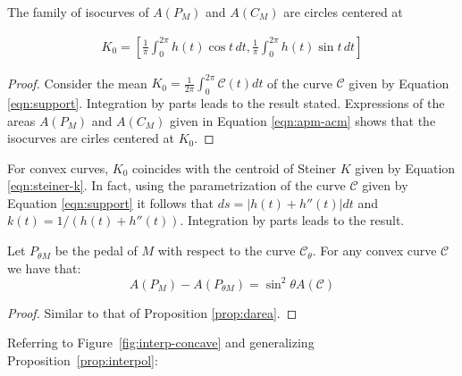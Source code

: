 
\begin{corollary} The family of isocurves of $A(P_M)$ and $A(C_M)$ are circles centered at
	
\begin{align*}
K_0=\left[  	\frac{1}{\pi} \int_0^{2\pi}\!\!\!\!\! h(t)\cos t \,dt,	\frac{1}{\pi} \int_0^{2\pi}\!\!\!\!\! h(t)\sin t \, dt\right]
\end{align*}
	
	
\end{corollary}
 
\begin{proof}  Consider the mean $K_0=\frac{1}{2\pi}\int_0^{2\pi}\mathcal{C}(t)dt$ of the curve $\mathcal{C}$ given by Equation \eqref{eqn:support}. Integration by parts leads to the result stated. Expressions of the areas $A(P_M)$ and $A(C_M)$ given in Equation \eqref{eqn:apm-acm} shows that the isocurves are cirles centered at $K_0$.
\end{proof}

\begin{remark}
For convex curves,  $K_0$ coincides with the   centroid of Steiner $K$ given by Equation \eqref{eqn:steiner-k}. In fact, using the parametrization  of the curve $\mathcal{C}$ given by Equation \eqref{eqn:support} it follows that
$ds= |h(t)+h''(t)|dt$ and $k(t)=1/(h(t)+h''(t))$. Integration by parts leads to the result.
\end{remark}

\begin{proposition} Let $P_{ {\theta }M}$ be the pedal of $M$ with respect to the curve $\mathcal{C}_\theta$.  For any convex curve $\mathcal{C}$ we have that:
	\[A(P_M)-A(P_{ {\theta }M})=\sin^2\theta A(\mathcal{C})\]
	
	\end{proposition}

\begin{proof} Similar to   that of Proposition \ref{prop:darea}.
\end{proof}

Referring to Figure~\ref{fig:interp-concave} and generalizing Proposition~\ref{prop:interpol}:

	
